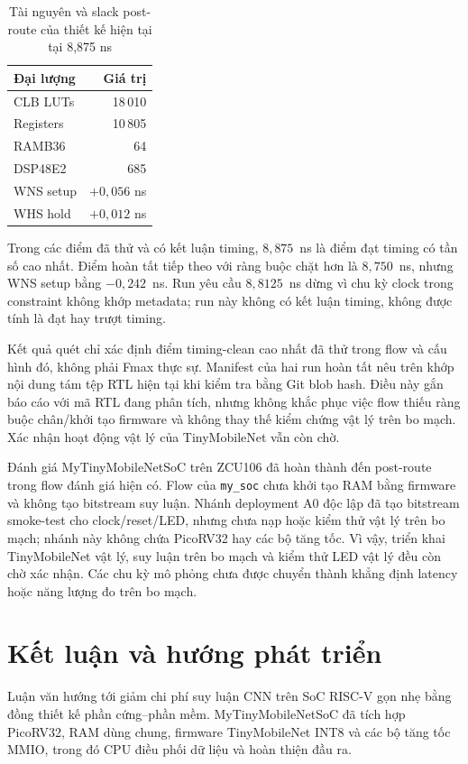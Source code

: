 \begin{table}[!ht]
\renewcommand{\arraystretch}{1.12}
\centering
\caption{Tài nguyên và slack post-route của thiết kế hiện tại tại 8,875 ns}
\label{tab:fpga-final}
\begin{tabular}{lr}
\hline
Đại lượng & Giá trị \\
\hline
CLB LUTs & 18\,010 \\
Registers & 10\,805 \\
RAMB36 & 64 \\
DSP48E2 & 685 \\
WNS setup & $+0{,}056$ ns \\
WHS hold & $+0{,}012$ ns \\
\hline
\end{tabular}
\end{table}
Trong các điểm đã thử và có kết luận timing, $8{,}875$~ns là điểm đạt timing có tần số cao nhất. Điểm hoàn tất tiếp theo với ràng buộc chặt hơn là $8{,}750$~ns, nhưng WNS setup bằng $-0{,}242$~ns. Run yêu cầu $8{,}8125$~ns dừng vì chu kỳ clock trong constraint không khớp metadata; run này không có kết luận timing, không được tính là đạt hay trượt timing.

Kết quả quét chỉ xác định điểm timing-clean cao nhất đã thử trong flow và cấu hình đó, không phải Fmax thực sự. Manifest của hai run hoàn tất nêu trên khớp nội dung tám tệp RTL hiện tại khi kiểm tra bằng Git blob hash. Điều này gắn báo cáo với mã RTL đang phân tích, nhưng không khắc phục việc flow thiếu ràng buộc chân/khởi tạo firmware và không thay thế kiểm chứng vật lý trên bo mạch. Xác nhận hoạt động vật lý của TinyMobileNet vẫn còn chờ.

Đánh giá MyTinyMobileNetSoC trên ZCU106 đã hoàn thành đến post-route trong flow đánh giá hiện có. Flow của \texttt{my\_soc} chưa khởi tạo RAM bằng firmware và không tạo bitstream suy luận. Nhánh deployment A0 độc lập đã tạo bitstream smoke-test cho clock/reset/LED, nhưng chưa nạp hoặc kiểm thử vật lý trên bo mạch; nhánh này không chứa PicoRV32 hay các bộ tăng tốc. Vì vậy, triển khai TinyMobileNet vật lý, suy luận trên bo mạch và kiểm thử LED vật lý đều còn chờ xác nhận. Các chu kỳ mô phỏng chưa được chuyển thành khẳng định latency hoặc năng lượng đo trên bo mạch.

\section{Kết luận và hướng phát triển}
Luận văn hướng tới giảm chi phí suy luận CNN trên SoC RISC-V gọn nhẹ bằng đồng thiết kế phần cứng--phần mềm. MyTinyMobileNetSoC đã tích hợp PicoRV32, RAM dùng chung, firmware TinyMobileNet INT8 và các bộ tăng tốc MMIO, trong đó CPU điều phối dữ liệu và hoàn thiện đầu ra.

